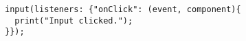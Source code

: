 
\begin{verbatim}
input(listeners: {"onClick": (event, component){
  print("Input clicked.");
}});
\end{verbatim}
